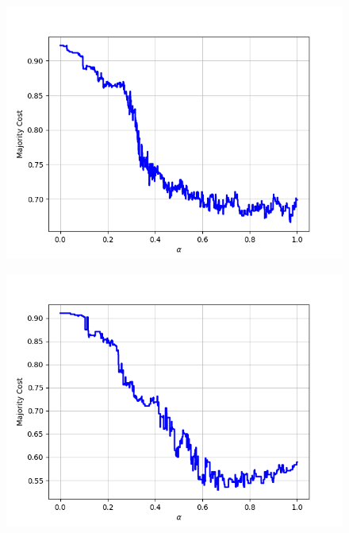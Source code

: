 \begin{figure}[H]
\begin{minipage}{.24\textwidth}
  {\includegraphics[width=\linewidth]{plots/omniglot-intra-sc-cnn/Futurama}}
\end{minipage}
\begin{minipage}{.24\textwidth}
  \centering
  {\includegraphics[width=\linewidth]{plots/omniglot-intra-sc-cnn/Grantha}}
\end{minipage}
\begin{minipage}{.24\textwidth}
  \centering

\end{minipage}
\end{figure}
